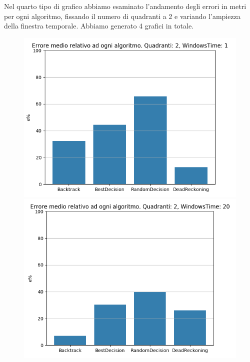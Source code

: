 \documentclass[12pt,a4paper,openright,twoside]{report}
\begin{document}
Nel quarto tipo di grafico abbiamo esaminato l'andamento degli errori in metri per ogni algoritmo, fissando il numero di quadranti a 2 e variando l'ampiezza della finestra temporale. Abbiamo generato 4 grafici in totale.


\begin{figure}[H]
\centering 
\includegraphics[scale=0.4]{secondChart2-1} 
\includegraphics[scale=0.4]{secondChart2-20} 
\end{figure}
\end{document}
